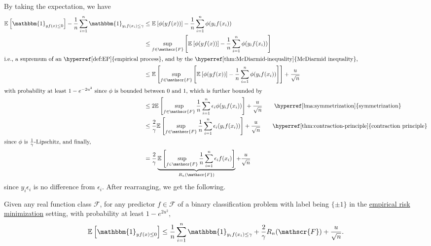 By taking the expectation, we have
\begin{align*}
	\mathbb{E}_{}\left[\mathbbm{1}_{y f(x) \leq 0} \right] - \frac{1}{n} \sum_{i=1}^{n} \mathbbm{1}_{y_i f(x_i) \leq \gamma }
	 & \leq \mathbb{E}_{}\left[\phi (y f(x)) \right] - \frac{1}{n} \sum_{i=1}^{n} \phi (y_i f(x_i))                                                                                                                             \\
	 & \leq \sup _{f\in \mathscr{F} } \left[ \mathbb{E}_{}\left[\phi (y f(x)) \right] - \frac{1}{n} \sum_{i=1}^{n} \phi (y_i f(x_i)) \right]                                                                                    \\
	\shortintertext{i.e., a supremum of an \hyperref[def:EP]{empirical process}, and by the \hyperref[thm:McDiarmid-inequality]{McDiarmid inequality},}
	 & \leq \mathbb{E}_{}\left[ \sup _{f\in \mathscr{F} } \left[ \mathbb{E}_{}\left[\phi (y f(x)) \right] - \frac{1}{n} \sum_{i=1}^{n} \phi (y_i f(x_i)) \right] \right] + \frac{u}{\sqrt{n} }                                  \\
	\shortintertext{with probability at least \(1 - e^{-2u^2}\) since \(\phi \) is bounded between \(0\) and \(1\), which is further bounded by}
	 & \leq 2 \mathbb{E}_{}\left[\sup _{f\in \mathscr{F} } \frac{1}{n} \sum_{i=1}^{n} \epsilon _i \phi (y_i f(x_i))\right] + \frac{u}{\sqrt{n} } \tag*{\hyperref[lma:symmetrization]{symmetrization}}                           \\
	 & \leq \frac{2}{\gamma } \mathbb{E}_{}\left[\sup _{f\in \mathscr{F} } \frac{1}{n} \sum_{i=1}^{n} \epsilon _i (y_i f(x_i)) \right] + \frac{u}{\sqrt{n} } \tag*{\hyperref[thm:contraction-principle]{contraction principle}} \\
	\shortintertext{since \(\phi \) is \(\frac{1}{\gamma }\)-Lipschitz, and finally,}
	 & = \frac{2}{\gamma } \underbrace{\mathbb{E}_{}\left[\sup _{f\in \mathscr{F} } \frac{1}{n} \sum_{i=1}^{n} \epsilon _i f(x_i)\right]}_{R_n(\mathscr{F} )} + \frac{u}{\sqrt{n} }
\end{align*}
since \(y_i \epsilon _i\) is no difference from \(\epsilon _i\). After rearranging, we get the following.

\begin{theorem}\label{thm:large-margin}
	Given any real function class \(\mathscr{F} \), for any predictor \(f \in \mathscr{F} \) of a binary classification problem with label being \(\{ \pm 1 \} \) in the \hyperref[prb:ERM]{empirical risk minimization} setting, with probability at least \(1 - e^{2u^2}\),
	\[
		\mathbb{E}_{}\left[\mathbbm{1}_{y f(x) \leq 0} \right]
		\leq \frac{1}{n} \sum_{i=1}^{n} \mathbbm{1}_{y_i f(x_i) \leq \gamma } + \frac{2}{\gamma } R_n (\mathscr{F} ) + \frac{u}{\sqrt{n} }.
	\]
\end{theorem}

